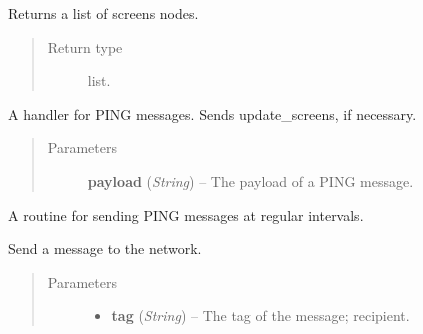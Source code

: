 \documentclass[letterpaper,10pt,english]{sphinxmanual}
\begin{document}
\begin{fulllineitems}
\begin{fulllineitems}
\begin{quote}
\begin{description}
\end{description}\end{quote}

\end{fulllineitems}


\begin{fulllineitems}
\label{swnp:swnp.SWNP.get_screen_list}
Returns a list of screens nodes.
\begin{quote}\begin{description}
\item[{Return type}] \leavevmode
list.

\end{description}\end{quote}

\end{fulllineitems}


\begin{fulllineitems}
\label{swnp:swnp.SWNP.ping_handler}
A handler for PING messages. Sends update\_screens, if necessary.
\begin{quote}\begin{description}
\item[{Parameters}] \leavevmode
\textbf{payload} (\emph{String}) -- The payload of a PING message.

\end{description}\end{quote}

\end{fulllineitems}


\begin{fulllineitems}
\label{swnp:swnp.SWNP.ping_routine}
A routine for sending PING messages at regular intervals.

\end{fulllineitems}


\begin{fulllineitems}
\label{swnp:swnp.SWNP.send}
Send a message to the network.
\begin{quote}\begin{description}
\item[{Parameters}] \leavevmode\begin{itemize}
\item {} 
\textbf{tag} (\emph{String}) -- The tag of the message; recipient.


\end{itemize}
\end{description}
\end{quote}
\end{fulllineitems}
\end{fulllineitems}
\end{document}

